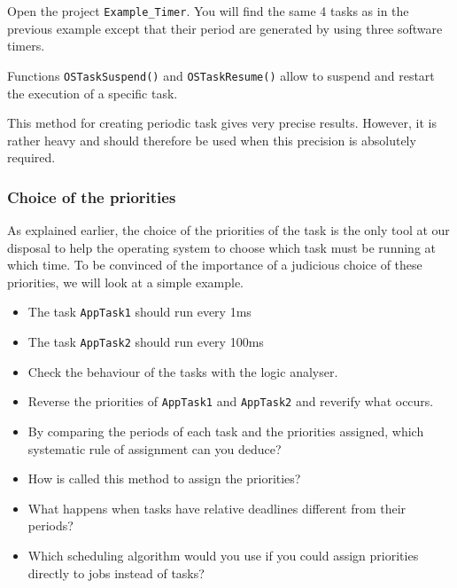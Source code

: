 \documentclass[10pt,a4paper]{article}
\theoremstyle{definition}%
\newcommand{\kw}[1]{\texttt{#1}}
\begin{document}
Open the project \kw{Example\_Timer}.
You will find the same 4 tasks as in the previous example except that their period are generated by
using three software timers.

Functions \kw{OSTaskSuspend()} and \kw{OSTaskResume()} allow to suspend and restart the execution of a
specific task.


This method for creating periodic task gives very precise results. However, it is rather heavy and
should therefore be used when this precision is absolutely required.


\subsubsection{Choice of the priorities}

As explained earlier, the choice of the priorities of the task is the only tool at our disposal to help the
operating system to choose which task must be running at which time. To be convinced of the
importance of a judicious choice of these priorities, we will look at a simple example.
\E{Open the project \kw{Example\_Priorites}.}{}
\begin{itemize}
\item The task \kw{AppTask1} should run every 1ms
\item The task \kw{AppTask2} should run every 100ms
\end{itemize}

\begin{itemize}
\item Check the behaviour of the tasks with the logic analyser.
\item Reverse the priorities of \kw{AppTask1} and \kw{AppTask2} and reverify what occurs.
\item By comparing the periods of each task and the priorities assigned, which systematic rule of
assignment can you deduce?
\item How is called this method to assign the priorities?
\item What happens when tasks have relative deadlines different from their periods?
\item Which scheduling algorithm would you use if you could assign priorities directly to jobs instead of
tasks?
\end{itemize}
\end{document}
